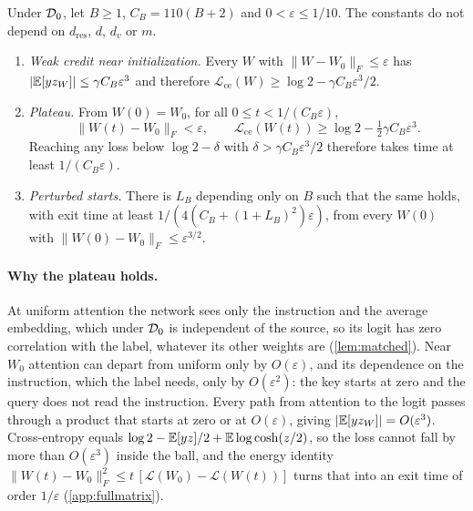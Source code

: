 \begin{mainresult}
\begin{theorem}
\label{thm:fullmatrix}
Under $\mathcal D_{0}$, let $B\ge1$, $C_B=110(B+2)$ and $0<\varepsilon\le1/10$. The constants do not depend on $d_{\mathrm{res}}$, $d$, $d_v$ or $m$.
\begin{enumerate}[label=(\roman*),leftmargin=*,itemsep=2pt,topsep=2pt]
\item \emph{Weak credit near initialization.} Every $W$ with $\|W-W_0\|_F\le\varepsilon$ has
$|\mathbb E[yz_W]|\le\gamma C_B\varepsilon^3$ and therefore $\mathcal L_{\mathrm{ce}}(W)\ge\log2-\gamma C_B\varepsilon^3/2$.
\item \emph{Plateau.} From $W(0)=W_0$, for all $0\le t<1/(C_B\varepsilon)$,
\[
 \|W(t)-W_0\|_F<\varepsilon,\qquad \mathcal L_{\mathrm{ce}}(W(t))\ge\log2-\tfrac12\gamma C_B\varepsilon^3 .
\]
Reaching any loss below $\log2-\delta$ with $\delta>\gamma C_B\varepsilon^3/2$ therefore takes time at least $1/(C_B\varepsilon)$.
\item \emph{Perturbed starts.} There is $L_B$ depending only on $B$ such that the same holds, with exit time at least $1/(4(C_B+(1+L_B)^2)\varepsilon)$,
from every $W(0)$ with $\|W(0)-W_0\|_F\le\varepsilon^{3/2}$.
\end{enumerate}
\end{theorem}
\end{mainresult}

\paragraph{Why the plateau holds.} At uniform attention the network sees only the instruction and the average embedding, which under $\mathcal D_{0}$ is independent of the source, so
its logit has zero correlation with the label, whatever its other weights are (\cref{lem:matched}). Near $W_0$ attention can depart from uniform only by $O(\varepsilon)$,
and its dependence on the instruction, which the label needs, only by $O(\varepsilon^2)$: the key starts at zero and the query does not read the instruction.
Every path from attention to the logit passes through a product that starts at zero or at $O(\varepsilon)$, giving $|\mathbb E[yz_W]|=O(\varepsilon^3)$.
Cross-entropy equals $\log2-\mathbb E[yz]/2+\mathbb E\log\cosh(z/2)$, so the loss cannot fall by more than $O(\varepsilon^3)$ inside the ball, and the energy identity
$\|W(t)-W_0\|_F^2\le t\,[\mathcal L(W_0)-\mathcal L(W(t))]$ turns that into an exit time of order $1/\varepsilon$ (\cref{app:fullmatrix}).

